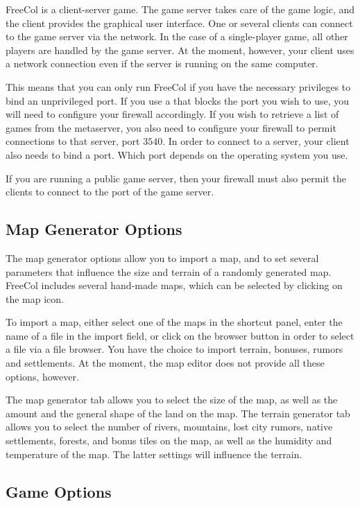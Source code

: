\documentclass[12pt]{book}
\begin{document}
FreeCol is a client-server game. The game server takes care of the
game logic, and the client provides the graphical user interface. One
or several clients can connect to the game server via the network. In
the case of a single-player game, all other players are handled by the
game server. At the moment, however, your client uses a network
connection even if the server is running on the same computer.

This means that you can only run FreeCol if you have the necessary
privileges to bind an unprivileged port. If you use a
 that blocks the port you wish to use, you
will need to configure your firewall accordingly. If you wish to
retrieve a list of games from the metaserver, you also need to
configure your firewall to permit connections to that server, port
$3540$. In order to connect to a server, your client also needs to
bind a port. Which port depends on the operating system you use.

If you are running a public game server, then your firewall must also
permit the clients to connect to the port of the game server.


\hypertarget{map generator options}{\subsection{Map Generator Options}}

The map generator options allow you to import a map, and to set
several parameters that influence the size and terrain of a randomly
generated map. FreeCol includes several hand-made maps, which can be
selected by clicking on the map icon.

To import a map, either select one of the maps in the shortcut panel,
enter the name of a file in the import field, or click on the browser
button in order to select a file via a file browser. You have the
choice to import terrain, bonuses, rumors and settlements. At the
moment, the map editor does not provide all these options, however.

The map generator tab allows you to select the size of the map, as
well as the amount and the general shape of the land on the map. The
terrain generator tab allows you to select the number of rivers,
mountains, lost city rumors, native settlements, forests, and bonus
tiles on the map, as well as the humidity and temperature of the
map. The latter settings will influence the terrain.


\hypertarget{game options}{\subsection{Game Options}}
\end{document}
